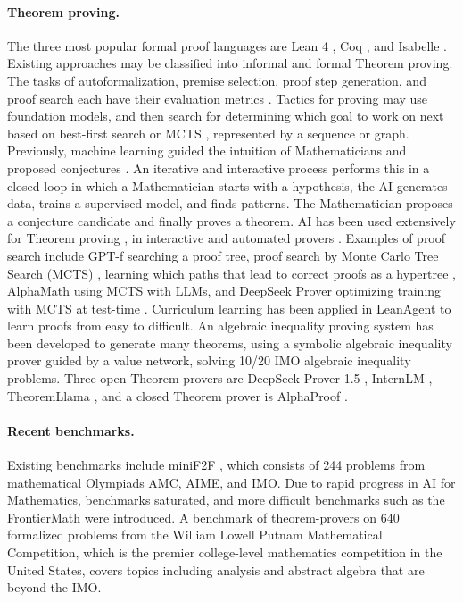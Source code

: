 \paragraph{Theorem proving.}
The three most popular formal proof languages are Lean 4 \cite{moura2021lean}, Coq \cite{coq2024}, and Isabelle \cite{nipkow2002isabelle}. Existing approaches may be classified into informal and formal Theorem proving. 
The tasks of autoformalization, premise selection, proof step generation, and proof search each have their evaluation metrics \cite{li2024survey}. Tactics for proving may use foundation models, and then search for determining which goal to work on next based on best-first search or MCTS \cite{lamont2024bait}, represented by a sequence or graph. Previously, machine learning guided the intuition of Mathematicians and proposed conjectures \cite{davies2021advancing}. An iterative and interactive process performs this in a closed loop in which a Mathematician starts with a hypothesis, the AI generates data, trains a supervised model, and finds patterns. The Mathematician proposes a conjecture candidate and finally proves a theorem. AI has been used extensively for Theorem proving \cite{li2024survey}, in interactive and automated provers \cite{polu2020generative,polu2022formal,yang2024leandojo,song2024towards,lin2024fvel,wang2024proving}. Examples of proof search include GPT-f \cite{polu2020generative} searching a proof tree, proof search by Monte Carlo Tree Search (MCTS) \cite{wu2020int}, learning which paths that lead to correct proofs as a hypertree  \cite{lample2022hypertree}, AlphaMath \cite{chen2024alphamath} using MCTS with LLMs, and DeepSeek Prover \cite{xin2024deepseek} optimizing training with MCTS at test-time \cite{xin2024deepseek}. Curriculum learning has been applied in LeanAgent \cite{kumarappan2024leanagent} to learn proofs from easy to difficult. An algebraic inequality proving system \cite{wei2024proving} has been developed to generate many theorems, using a symbolic algebraic inequality prover guided by a value network, solving 10/20 IMO algebraic inequality problems. Three open Theorem provers are DeepSeek Prover 1.5 \cite{xin2024deepseek}, InternLM \cite{wu2024internlm2}, TheoremLlama \cite{wang2024theoremllama}, and a closed Theorem prover is AlphaProof \cite{deepmindsilverblog}.

\paragraph{Recent benchmarks.}
Existing benchmarks include miniF2F \cite{zheng2021minif2f}, which consists of 244 problems from mathematical Olympiads AMC, AIME, and IMO. Due to rapid progress in AI for Mathematics, benchmarks saturated, and more difficult benchmarks such as the FrontierMath \cite{glazer2024frontiermath} were introduced. A benchmark of theorem-provers on 640 formalized problems \cite{tsoukalas2024putnambench} from the William Lowell Putnam Mathematical Competition, which is the premier college-level mathematics competition in the United States, covers topics including analysis and abstract algebra that are beyond the IMO.

